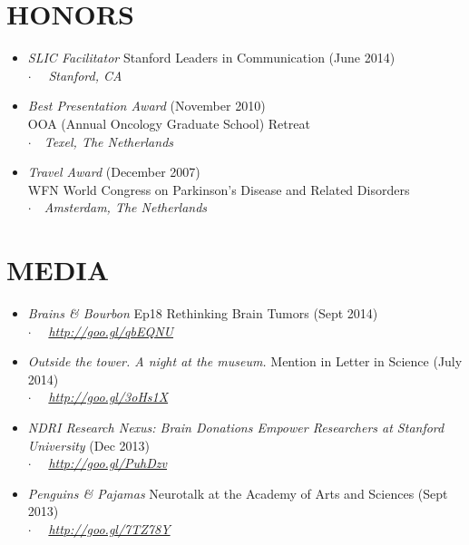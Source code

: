 \documentclass[line,margin]{res}
\newcommand{\placestyle}[1]{\footnotesize $\cdot$\ \ {\emph{#1}}}
\newcommand{\datestyle}[1]{{\tiny \dotfill} {\small (#1)}}
\begin{document}
\begin{resume}
\newpage
\section{HONORS}
\begin{itemize}
\item \emph{SLIC Facilitator} Stanford Leaders in Communication \datestyle{June 2014} \\
  { \placestyle{ Stanford, CA } }
\item \emph{Best Presentation Award} \datestyle{November 2010} \\
    {OOA (Annual Oncology Graduate School) Retreat} \\
    { \placestyle{Texel, The Netherlands} }
\item \emph{Travel Award} \datestyle{December 2007} \\
    {WFN World Congress on Parkinson's Disease and Related Disorders}  \\
    { \placestyle{Amsterdam, The Netherlands} }
\end{itemize}

\section{MEDIA}
\begin{itemize}
\item \emph{Brains \& Bourbon} Ep18 Rethinking Brain Tumors \datestyle{Sept 2014} \\
  {\placestyle{ \url{http://goo.gl/qbEQNU}}}
\item \emph{Outside the tower. A night at the museum.} Mention in Letter in Science \datestyle{July 2014} \\
  {\placestyle{ \url{http://goo.gl/3oHs1X}}}
\item \emph{NDRI Research Nexus: Brain Donations Empower Researchers at Stanford University} \datestyle{Dec 2013}\\
  {\placestyle{ \url{http://goo.gl/PuhDzv}}}
\item \emph{Penguins \& Pajamas} Neurotalk at the Academy of Arts and Sciences \datestyle{Sept 2013} \\
  {\placestyle{ \url{http://goo.gl/7TZ78Y}}}
\end{itemize}


\end{resume}
\end{document}

